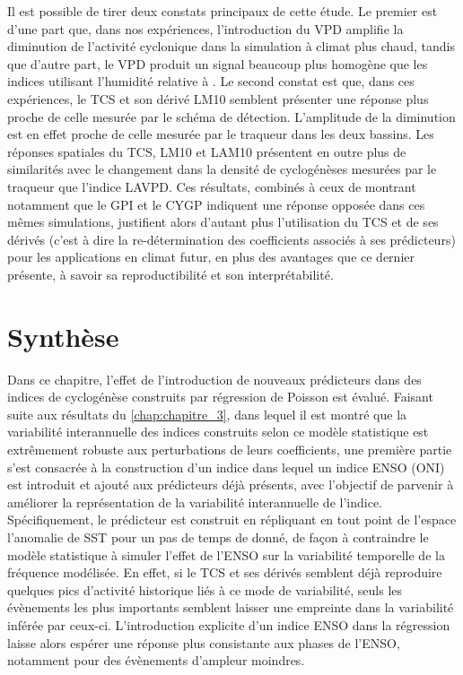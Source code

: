 \documentclass[../main.tex]{subfiles}
\begin{document}
Il est possible de tirer deux constats principaux de cette étude. Le premier est d'une part que, dans nos expériences, l'introduction du VPD amplifie la
diminution de l'activité cyclonique dans la simulation à climat plus chaud, tandis que d'autre part, le VPD produit un signal beaucoup plus homogène que les
indices utilisant l'humidité relative à . Le second constat est que, dans ces expériences, le TCS et son dérivé LM10 semblent présenter une réponse
plus proche de celle mesurée par le schéma de détection. L'amplitude de la diminution est en effet proche de celle mesurée par le traqueur dans les deux
bassins. Les réponses spatiales du TCS, LM10 et LAM10 présentent en outre plus de similarités avec le changement dans la densité de cyclogénèses mesurées par le
traqueur que l'indice LAVPD. Ces résultats, combinés à ceux de \textcite{cattiaux_projected_2020,chauvin_future_2020} montrant notamment que le GPI et le CYGP
indiquent une réponse opposée dans ces mêmes simulations, justifient alors d'autant plus l'utilisation du TCS et de ses dérivés (c'est à dire la re-détermination
des coefficients associés à ses prédicteurs) pour les applications en climat futur, en plus des avantages que ce dernier présente, à savoir sa reproductibilité
et son interprétabilité.

\section{Synthèse}

Dans ce chapitre, l'effet de l'introduction de nouveaux prédicteurs dans des indices de cyclogénèse construits par régression de Poisson est évalué. Faisant
suite aux résultats du \cref{chap:chapitre_3}, dans lequel il est montré que la variabilité interannuelle des indices construits selon ce modèle statistique est
extrêmement robuste aux perturbations de leurs coefficients, une première partie s'est consacrée à la construction d'un indice dans lequel un indice ENSO (ONI)
est introduit et ajouté aux prédicteurs déjà présents, avec l'objectif de parvenir à améliorer la représentation de la variabilité interannuelle de
l'indice. Spécifiquement, le prédicteur est construit en répliquant en tout point de l'espace l'anomalie de SST pour un pas de temps de donné, de façon à
contraindre le modèle statistique à simuler l'effet de l'ENSO sur la variabilité temporelle de la fréquence modélisée. En effet, si le TCS et ses dérivés
semblent déjà reproduire quelques pics d'activité historique liés à ce mode de variabilité, seuls les évènements les plus importants semblent laisser une
empreinte dans la variabilité inférée par ceux-ci. L'introduction explicite d'un indice ENSO dans la régression laisse alors espérer une réponse plus
consistante aux phases de l'ENSO, notamment pour des évènements d'ampleur moindres.
\end{document}
